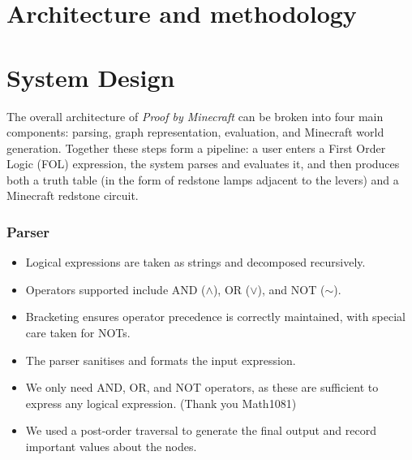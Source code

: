 \documentclass[11pt]{diazessay} %
\begin{document}

\section*{Architecture and methodology}

\section{System Design}

The overall architecture of \textit{Proof by Minecraft} can be broken into four
main components: parsing, graph representation, evaluation, and Minecraft
world generation. Together these steps form a pipeline: a user enters a
First Order Logic (FOL) expression, the system parses and evaluates
it, and then produces both a truth table (in the form of redstone lamps adjacent to the levers) and a Minecraft redstone circuit.

\subsubsection*{Parser}
\begin{itemize}
    \item Logical expressions are taken as strings and decomposed recursively.
    \item Operators supported include AND ($\wedge$), OR ($\vee$), and NOT ($\sim$).
    \item Bracketing ensures operator precedence is correctly maintained, with 
    special care taken for NOTs.
    \item The parser sanitises and formats the input expression.
    \item We only need AND, OR, and NOT operators, as these are sufficient to express any logical expression. (Thank you Math1081)
    \item We used a post-order traversal to generate the final output and record important values about the nodes.
\end{itemize}
\end{document}
